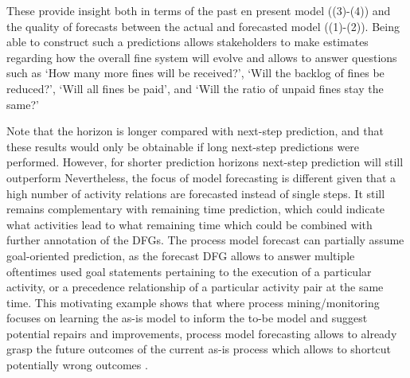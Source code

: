 These provide insight both in terms of the past en present model ((3)-(4)) and the quality of forecasts between the actual and forecasted model ((1)-(2)).
Being able to construct such a predictions allows stakeholders to make estimates regarding how the overall fine system will evolve and allows to answer questions such as `How many more fines will be received?', `Will the backlog of fines be reduced?', `Will all fines be paid', and `Will the ratio of unpaid fines stay the same?'

Note that the horizon is longer compared with next-step prediction, and that these results would only be obtainable if long next-step predictions were performed.
However, for shorter prediction horizons next-step prediction will still outperform 
Nevertheless, the focus of model forecasting is different given that a high number of activity relations are forecasted instead of single steps.
It still remains complementary with remaining time prediction, which could indicate what activities lead to what remaining time which could be combined with further annotation of the DFGs.
The process model forecast can partially assume goal-oriented prediction, as the forecast DFG allows to answer multiple oftentimes used goal statements pertaining to the execution of a particular activity, or a precedence relationship of a particular activity pair \cite{DBLP:journals/tkdd/TeinemaaDRM19} at the same time.
This motivating example shows that where process mining/monitoring focuses on learning the as-is model to inform the to-be model and suggest potential repairs and improvements, process model forecasting allows to already grasp the future outcomes of the current as-is process which allows to shortcut potentially wrong outcomes \cite{DBLP:conf/bpm/PollPRRR18}.
